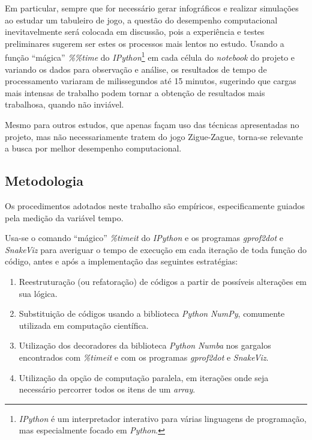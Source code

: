 \documentclass[12pt]{article}
\newcommand{\aspas}[1]{``#1''} %
\begin{document}
Em particular, sempre que for necessário gerar infográficos e realizar simulações ao estudar um tabuleiro de jogo, a questão do desempenho computacional inevitavelmente será colocada em discussão, pois a experiência e testes preliminares sugerem ser estes os processos mais lentos no estudo. Usando a função \aspas{mágica} \textit{\%\%time} do \textit{IPython}\footnote{\textit{IPython} é um interpretador interativo para várias linguagens de programação, mas especialmente focado em \textit{Python}.} em cada célula do \textit{notebook} do projeto e variando os dados para observação e análise, os resultados de tempo de processamento variaram de milissegundos até 15 minutos, sugerindo que cargas mais intensas de trabalho podem tornar a obtenção de resultados mais trabalhosa, quando não inviável. 

Mesmo para outros estudos, que apenas façam uso das técnicas apresentadas no projeto, mas não necessariamente tratem do jogo Zigue-Zague, torna-se relevante a busca por melhor desempenho computacional.

\subsection{Metodologia}
\label{metodologia}

Os procedimentos adotados neste trabalho são empíricos, especificamente guiados pela medição da variável tempo.

Usa-se o comando \aspas{mágico} \textit{\%timeit} do \textit{IPython} e os programas \textit{gprof2dot} e \textit{SnakeViz} para averiguar o tempo de execução em cada iteração de toda função do código, antes e após a implementação das seguintes estratégias:

\begin{enumerate}
	\item \label{reestruturacao} Reestruturação (ou refatoração) de códigos a partir de possíveis alterações em sua lógica.
	
	\item \label{substituicao} Substituição de códigos usando a biblioteca \textit{Python} \textit{NumPy}, comumente utilizada em computação científica.
	
	\item \label{decoradores} Utilização dos decoradores da biblioteca \textit{Python} \textit{Numba} nos gargalos encontrados com \textit{\%timeit} e com os programas \textit{gprof2dot} e \textit{SnakeViz}.
	
	\item \label{paralela} Utilização da opção de computação paralela, em iterações onde seja necessário percorrer todos os itens de um \textit{array}.
\end{enumerate}
\end{document}
